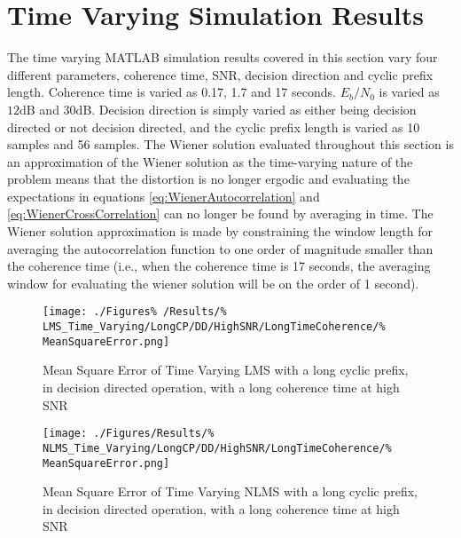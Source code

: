 \section{Time Varying Simulation Results}
\label{sec:TVResults}
The time varying MATLAB simulation results covered in this section %
vary four different parameters, coherence time, SNR, decision %
direction and cyclic prefix length. Coherence time is varied as %
0.17, 1.7 and 17 seconds. $E_b/N_0$ is varied as $12\text{dB}$ and %
$30\text{dB}$. Decision direction is simply varied as either %
being decision directed or not decision directed, and the cyclic %
prefix length is varied as 10 samples and 56 samples. The Wiener %
solution evaluated throughout this section is an approximation %
of the Wiener solution as the time-varying nature of the problem %
means that the distortion is no longer ergodic and evaluating the %
expectations in equations \ref{eq:WienerAutocorrelation} and %
\ref{eq:WienerCrossCorrelation} can no longer be found by %
averaging in time. The Wiener solution approximation is made %
by constraining the window length for averaging the %
autocorrelation function to one order of magnitude smaller %
than the coherence time (i.e., when the coherence time is 17 %
seconds, the averaging window for evaluating the wiener solution %
will be on the order of 1 second).
\begin{figure}[ht]
	\centering
	\begin{minipage}{0.49\textwidth}
		\centering
		\texttt{[image: ./Figures\%
		/Results/\%
	LMS\_Time\_Varying/LongCP/DD/HighSNR/LongTimeCoherence/\%
	MeanSquareError.png]}
		\captionsetup{width=0.75\linewidth}
		\caption{Mean Square Error of Time Varying LMS with 
		a long cyclic prefix, in decision directed operation,
		with a long coherence time at high SNR}
	\end{minipage}
	\begin{minipage}{0.49\textwidth}
		\centering
		\texttt{[image: ./Figures/Results/\%
	NLMS\_Time\_Varying/LongCP/DD/HighSNR/LongTimeCoherence/\%
	MeanSquareError.png]}
		\captionsetup{width=0.75\linewidth}
		\caption{Mean Square Error of Time Varying NLMS with 
		a long cyclic prefix, in decision directed operation,
		with a long coherence time at high SNR}
	\end{minipage}
\end{figure}
